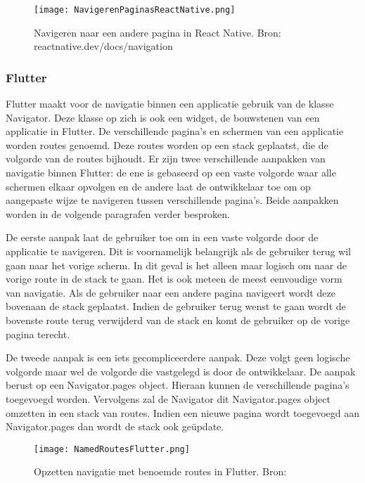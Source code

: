 \begin{figure}
    \texttt{[image: NavigerenPaginasReactNative.png]}
    \caption{Navigeren naar een andere pagina in React Native. Bron: reactnative.dev/docs/navigation}
    \label{fig:navigerenReactNative}
\end{figure}

\subsubsection{Flutter}
\label{subsubsec:navigatieFlutter}

Flutter maakt voor de navigatie binnen een applicatie gebruik van de klasse Navigator. Deze klasse op zich is ook een widget, de bouwstenen van een applicatie in Flutter. De verschillende pagina's en schermen van een applicatie worden routes genoemd. Deze routes worden op een stack geplaatst, die de volgorde van de routes bijhoudt. Er zijn twee verschillende aanpakken van navigatie binnen Flutter: de ene is gebaseerd op een vaste volgorde waar alle schermen elkaar opvolgen en de andere laat de ontwikkelaar toe om op aangepaste wijze te navigeren tussen verschillende pagina's. Beide aanpakken worden in de volgende paragrafen verder besproken. 

De eerste aanpak laat de gebruiker toe om in een vaste volgorde door de applicatie te navigeren. Dit is voornamelijk belangrijk als de gebruiker terug wil gaan naar het vorige scherm. In dit geval is het alleen maar logisch om naar de vorige route in de stack te gaan. Het is ook meteen de meest eenvoudige vorm van navigatie. Als de gebruiker naar een andere pagina navigeert wordt deze bovenaan de stack geplaatst. Indien de gebruiker terug wenst te gaan wordt de bovenste route terug verwijderd van de stack en komt de gebruiker op de vorige pagina terecht.

De tweede aanpak is een iets gecompliceerdere aanpak. Deze volgt geen logische volgorde maar wel de volgorde die vastgelegd is door de ontwikkelaar. De aanpak berust op een Navigator.pages object. Hieraan kunnen de verschillende pagina's toegevoegd worden. Vervolgens zal de Navigator dit Navigator.pages object omzetten in een stack van routes. Indien een nieuwe pagina wordt toegevoegd aan Navigator.pages dan wordt de stack ook geüpdate. 

\begin{figure}
    \texttt{[image: NamedRoutesFlutter.png]}
    \caption{Opzetten navigatie met benoemde routes in Flutter. Bron: \textcite{Flutter.dev2020}}
    \label{fig:namedRoutesFlutter}
\end{figure}


